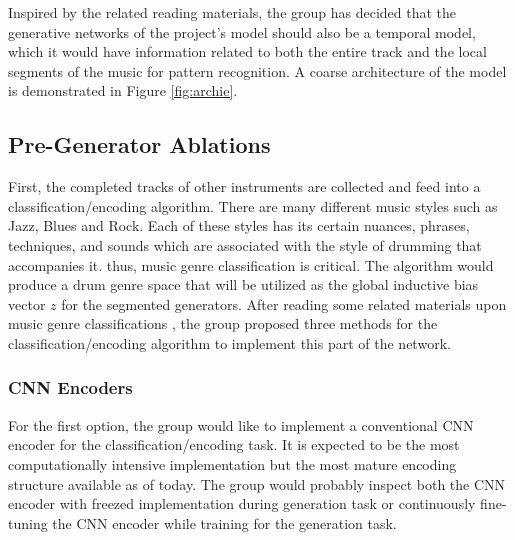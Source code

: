 \begin{par}
    \par \hspace{15pt} Inspired by the related reading materials, the group has decided that the generative networks of the project's model should also be a temporal model, which it would have information related to both the entire track and the local segments of the music for pattern recognition. A coarse architecture of the model is demonstrated in Figure \ref{fig:archie}. 
    
    \subsection{Pre-Generator Ablations} %
    \label{sub:Pre-Generator Ablations}
    \par \hspace{15pt}  First, the completed tracks of other instruments are collected and feed into a classification/encoding algorithm. There are many different music styles such as Jazz, Blues and Rock. Each of these styles has its certain nuances, phrases, techniques, and sounds which are associated with the style of drumming that accompanies it. thus, music genre classification is critical. The algorithm would produce a drum genre space that will be utilized as the global inductive bias vector $z$ for the segmented generators. After reading some related materials upon music genre classifications \cite{transfer_classification, active_classification, cnn_classification, svm_classification}, the group proposed three methods for the classification/encoding algorithm to implement this part of the network.

        \subsubsection{CNN Encoders} %
        \label{ssub:Convolution Neural Network Encoders}
            \par \hspace{15pt} For the first option, the group would like to implement a conventional CNN encoder for the classification/encoding task. It is expected to be the most computationally intensive implementation but the most mature encoding structure available as of today. The group would probably inspect both the CNN encoder with freezed implementation during generation task or continuously fine-tuning the CNN encoder while training for the generation task.


\end{par}
